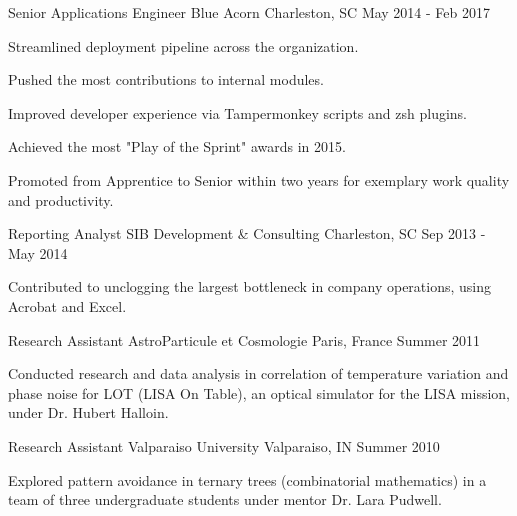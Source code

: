 

\begin{cventries}

  \cventry
    {Senior Applications Engineer} %
    {Blue Acorn} %
    {Charleston, SC} %
    {May 2014 - Feb 2017} %
    {
      \begin{cvitems} %
        \item {Streamlined deployment pipeline across the organization.}
        \item {Pushed the most contributions to internal modules.}
        \item {Improved developer experience via Tampermonkey scripts and zsh plugins.}
        \item {Achieved the most "Play of the Sprint" awards in 2015.}
        \item {Promoted from Apprentice to Senior within two years for exemplary work quality and productivity.}
      \end{cvitems}
    }

  \cventry
    {Reporting Analyst}
    {SIB Development \& Consulting}
    {Charleston, SC}
    {Sep 2013 - May 2014}
    {
      \begin{cvitems}
        \item {Contributed to unclogging the largest bottleneck in company operations, using Acrobat and Excel.}
      \end{cvitems}
    }

  \cventry
    {Research Assistant}
    {AstroParticule et Cosmologie}
    {Paris, France}
    {Summer 2011}
    {
      \begin{cvitems}
        \item {Conducted research and data analysis in correlation of temperature variation and phase noise for LOT (LISA On Table), an optical simulator for the LISA mission, under Dr. Hubert Halloin.}
      \end{cvitems}
    }

  \cventry
    {Research Assistant}
    {Valparaiso University}
    {Valparaiso, IN}
    {Summer 2010}
    {
      \begin{cvitems}
        \item {Explored pattern avoidance in ternary trees (combinatorial mathematics) in a team of three undergraduate students under mentor Dr. Lara Pudwell.}
      \end{cvitems}
    }

\end{cventries}
